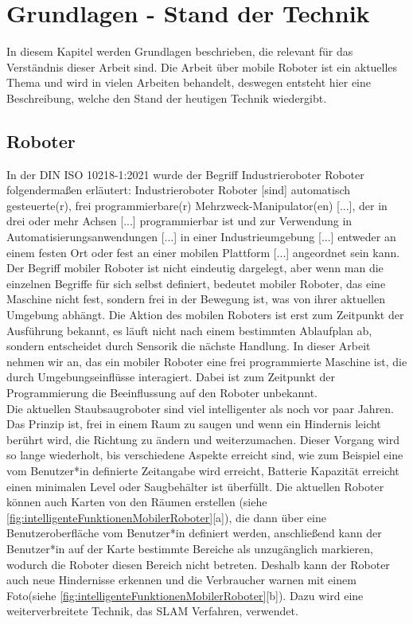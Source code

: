 \chapter{Grundlagen - Stand der Technik}
In diesem Kapitel werden Grundlagen beschrieben, die relevant für das Verständnis dieser Arbeit sind. Die Arbeit über mobile Roboter ist ein aktuelles Thema und wird in vielen Arbeiten behandelt, deswegen entsteht hier eine Beschreibung, welche den Stand der heutigen Technik wiedergibt.

\section{Roboter}
In der DIN ISO 10218-1:2021 wurde der Begriff Industrieroboter Roboter folgendermaßen erläutert: \glqq Industrieroboter Roboter [sind] automatisch gesteuerte(r), frei programmierbare(r) Mehrzweck-Manipulator(en) [...], der in drei oder mehr Achsen [...] programmierbar ist und zur Verwendung in Automatisierungsanwendungen [...] in einer Industrieumgebung [...] entweder an einem festen Ort oder fest an einer mobilen Plattform [...] angeordnet sein kann\glqq. \cite{DIN_ISO_Robotik.2021}\\

Der Begriff mobiler Roboter ist nicht eindeutig dargelegt, aber wenn man die einzelnen Begriffe für sich selbst definiert, bedeutet mobiler Roboter, das eine Maschine nicht fest, sondern frei in der Bewegung ist, was von ihrer aktuellen Umgebung abhängt. Die Aktion des mobilen Roboters ist erst zum Zeitpunkt der Ausführung bekannt, es läuft nicht nach einem bestimmten Ablaufplan ab, sondern entscheidet durch Sensorik die nächste Handlung. In dieser Arbeit nehmen wir an, das ein mobiler Roboter eine frei programmierte Maschine ist, die durch Umgebungseinflüsse interagiert. Dabei ist zum Zeitpunkt der Programmierung die Beeinflussung auf den Roboter unbekannt. \cite[S.1ff]{RobotikSichtInformatik.2012}\\

Die aktuellen Staubsaugroboter sind viel intelligenter als noch vor paar Jahren. Das Prinzip ist, frei in einem Raum zu saugen und wenn ein Hindernis leicht berührt wird, die Richtung zu ändern und weiterzumachen. Dieser Vorgang wird so lange wiederholt, bis verschiedene Aspekte erreicht sind, wie zum Beispiel eine vom Benutzer*in definierte Zeitangabe wird erreicht, Batterie Kapazität erreicht einen minimalen Level oder Saugbehälter ist überfüllt. Die aktuellen Roboter können auch Karten von den Räumen erstellen (siehe \autoref{fig:intelligenteFunktionenMobilerRoboter}[a]), die dann über eine Benutzeroberfläche vom Benutzer*in definiert werden, anschließend kann der Benutzer*in auf der Karte bestimmte Bereiche als unzugänglich markieren, wodurch die Roboter diesen Bereich nicht betreten. Deshalb kann der Roboter auch neue Hindernisse erkennen und die Verbraucher warnen mit einem Foto(siehe \autoref{fig:intelligenteFunktionenMobilerRoboter}[b]). Dazu wird eine weiterverbreitete Technik, das SLAM Verfahren, verwendet.


